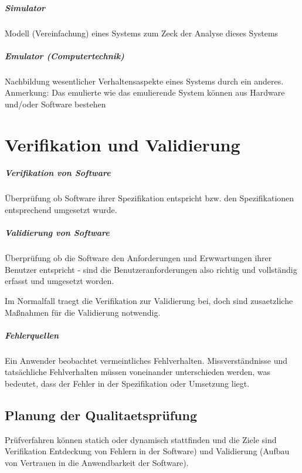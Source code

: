 \paragraph{Simulator}
Modell (Vereinfachung) eines Systems zum Zeck der Analyse dieses Systems 

\paragraph{Emulator (Computertechnik)}
Nachbildung wesentlicher Verhaltensaspekte eines Systems durch ein anderes. Anmerkung: Das emulierte wie das emulierende System können aus Hardware und/oder Software bestehen

\chapter{Verifikation und Validierung}

\paragraph{Verifikation von Software}
Überprüfung ob Software ihrer Spezifikation entspricht bzw. den Spezifikationen entsprechend umgesetzt wurde.

\paragraph{Validierung von Software}
Überprüfung ob die Software den Anforderungen und Erwwartungen ihrer Benutzer entspricht - sind die Benutzeranforderungen also richtig und  vollständig erfasst und umgesetzt worden.

Im Normalfall traegt die Verifikation zur Validierung bei, doch sind zusaetzliche Maßnahmen für die Validierung notwendig.

\paragraph{Fehlerquellen}
Ein Anwender beobachtet vermeintliches Fehlverhalten. Missverständnisse und tatsächliche Fehlverhalten müssen voneinander unterschieden werden, was bedeutet, dass der Fehler in der Spezifikation oder Umsetzung liegt.

\section{Planung der Qualitaetsprüfung}
Prüfverfahren können statich oder dynamisch stattfinden und die Ziele sind Verifikation Entdeckung von Fehlern in der Software) und Validierung (Aufbau von Vertrauen in die Anwendbarkeit der Software).

